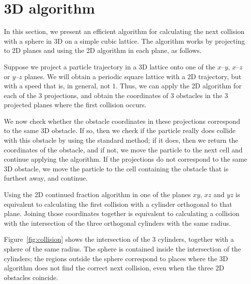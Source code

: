 \documentclass[pre,amsmath,amssymb, twocolumn, showpacs]{revtex4-1}
\begin{document}
\section{3D algorithm}

In this section, we present an efficient algorithm for calculating the next collision with a sphere in 3D on a simple cubic lattice. The algorithm works by projecting to 2D planes and using the 2D algorithm in each plane, as follows.

Suppose we project a particle trajectory in a 3D lattice onto one of the $x$--$y$, $x$--$z$ or 
$y$--$z$ planes. We will obtain a periodic square lattice with a 2D trajectory, but with a speed that is, in general, not $1$. 
Thus, we can apply the 2D algorithm for each of the 3 projections, and obtain the coordinates of 3 obstacles in the 3 projected planes where the first collision occurs.  

We now check whether the obstacle coordinates in these projections correspond to the same 3D obstacle. If so, then we check if the particle really does collide with this obstacle by using the standard method; if it does, then we return the coordinates of the obstacle, and if not, we move the particle to the next cell and continue applying the algorithm. If the projections do not correspond to the same 3D obstacle, we move the particle to the cell containing the obstacle that is furthest away, and continue.


Using the 2D continued fraction algorithm in one of the planes $xy$, $xz$ and $yz$ is equivalent to calculating the first collision with a cylinder orthogonal 
to that plane. Joining those coordinates together is equivalent to calculating a collision with the intersection of the three orthogonal cylinders with the same radius. 

Figure~\ref{fig:collision} shows the intersection of the 3 cylinders, together with a sphere of the same radius. The sphere is contained inside the intersection of the cylinders; the 
 regions outside the sphere correspond to places where the 3D algorithm does not find the correct next collision, even when the three 2D obstacles coincide.
 
\end{document}
